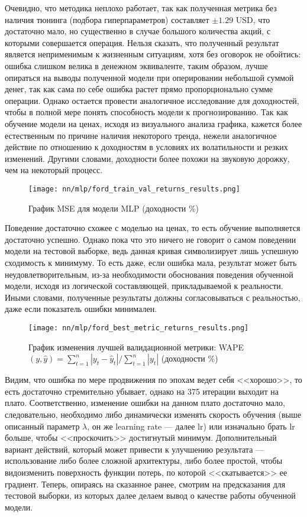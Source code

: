 Очевидно, что методика неплохо работает, так как полученная метрика без наличия тюнинга (подбора гиперпараметров) составляет $\pm 1.29$ USD, что достаточно мало, но существенно в случае большого количества акций, с которыми совершается операция. Нельзя сказать, что полученный результат является неприменимым к жизненным ситуациям, хотя без оговорок не обойтись: ошибка слишком велика в денежном эквиваленте, таким образом, лучше опираться на выводы полученной модели при оперировании небольшой суммой денег, так как сама по себе ошибка растет прямо пропорционально сумме операции. Однако остается провести аналогичное исследование для доходностей, чтобы в полной мере понять способность модели к прогнозированию. Так как обучение модели на ценах, исходя из визуального анализа графика, кажется более естественным по причине наличия некоторого тренда, нежели аналогичное действие по отношению к доходностям в условиях их волатильности и резких изменений. Другими словами, доходности более похожи на звуковую дорожку, чем на некоторый процесс.
\begin{figure}[H]
	\centering
	\texttt{[image: nn/mlp/ford\_train\_val\_returns\_results.png]}
	\caption{График MSE для модели MLP (доходности \%)}
	\label{fig::ford_train_val_returns_results}
\end{figure}
Поведение достаточно схожее с моделью на ценах, то есть обучение выполняется достаточно успешно. Однако пока что это ничего не говорит о самом поведении модели на тестовой выборке, ведь данная кривая символизирует лишь успешную сходимость к минимуму. То есть даже, если ошибка мала, результат может быть неудовлетворительным, из-за необходимости обоснования поведения обученной модели, исходя из логической составляющей, прикладываемой к реальности. Иными словами, полученные результаты должны согласовываться с реальностью, даже если показатель ошибки минимален.
\begin{figure}[H]
	\centering
	\texttt{[image: nn/mlp/ford\_best\_metric\_returns\_results.png]}
	\caption{График изменения лучшей валидационной метрики: WAPE$(y, \hat{y}) = \sum_{t = 1}^n |y_t - \hat{y}_t| / \sum_{t = 1}^n |y_t|$ (доходности \%)}
	\label{fig::ford_best_metric_returns_results}
\end{figure}
Видим, что ошибка по мере продвижения по эпохам ведет себя <<хорошо>>, то есть достаточно стремительно убывает, однако на 375 итерации выходит на плато. Соответственно, изменение ошибки на данном плато достаточно мало, следовательно, необходимо либо динамически изменять скорость обучения (выше описанный параметр $\lambda$, он же learning rate --- далее lr) или изначально брать lr больше, чтобы <<проскочить>> достигнутый минимум. Дополнительный вариант действий, который может привести к улучшению результата --- использование либо более сложной архитектуры, либо более простой, чтобы видоизменить поверхность функции потерь, по которой <<скатывается>> ее градиент. Теперь, опираясь на сказанное ранее, смотрим на предсказания для тестовой выборки, из которых далее делаем вывод о качестве работы обученной модели.
